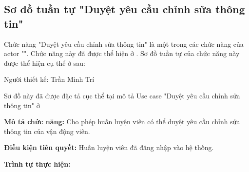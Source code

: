 \subsection{Sơ đồ tuần tự "Duyệt yêu cầu chỉnh sửa thông tin"}
\setcounter{figure}{0}

Chức năng "Duyệt yêu cầu chỉnh sửa thông tin" là một trong các chức năng của actor "".
Chức năng này đã được thể hiện ở \myref{}.
Sơ đồ tuần tự của chức năng này được thể hiện cụ thể ở \myref{} sau:

Người thiết kế: Trần Minh Trí

Sơ đồ này đã được đặc tả cục thể tại mô tả Use case
"Duyệt yêu cầu chỉnh sửa thông tin" ở 

\noindent
\textbf{Mô tả chức năng:} Cho phép huấn luyện viên có thể duyệt yêu cầu chỉnh sửa thông tin của vận động viên.

\noindent
\textbf{Điều kiện tiên quyết:} Huấn luyện viên đã đăng nhập vào hệ thống.

\noindent
\textbf{Trình tự thực hiện:}

